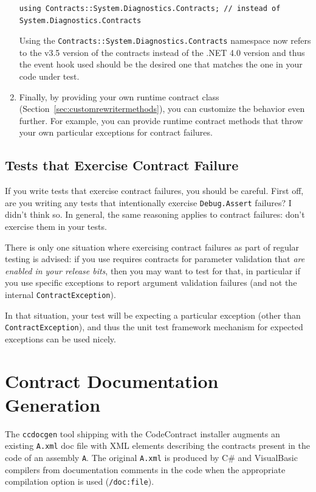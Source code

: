 \documentclass{article}
\newcommand{\code}[1]{\lstinline{#1}}
\begin{document}
\begin{enumerate}
\begin{lstlisting}
using Contracts::System.Diagnostics.Contracts; // instead of System.Diagnostics.Contracts
\end{lstlisting}
\noindent
Using the \code{Contracts::System.Diagnostics.Contracts} namespace now
refers to the v3.5 version of the contracts instead of the .NET 4.0
version and thus the event hook used should be the desired one that
matches the one in your code under test.

\item Finally, by providing your own runtime contract class
  (Section~\ref{sec:customrewritermethods}), you can customize the
  behavior even further. For example, you can provide runtime
  contract methods that throw your own particular exceptions for
  contract failures.
\end{enumerate}

\subsection{Tests that Exercise Contract Failure}
If you write tests that exercise contract failures, you should be
careful. First off, are you writing any tests that intentionally exercise
\code{Debug.Assert} failures? I didn't think so. In general, the same
reasoning applies to contract failures: don't exercise them in your
tests.

There is only one situation where exercising contract failures as part
of regular testing is advised: if you use requires contracts for
parameter validation that \emph{are enabled in your release bits}, then you may
want to test for that, in particular if you use specific exceptions to
report argument validation failures (and not the internal \code{ContractException}).

In that situation, your test will be expecting a particular exception
(other than \code{ContractException}), and thus the unit test
framework mechanism for expected exceptions can be used nicely.
 
\section{Contract Documentation Generation}
\label{sec:docgen}
The \code{ccdocgen} tool shipping with the CodeContract installer
augments an existing \code{A.xml} doc file with XML elements describing
the contracts present in the code of an assembly \code{A}. The
original \code{A.xml} is produced by C\# and VisualBasic compilers
from documentation comments in the code when the appropriate
compilation option is used (\code{/doc:file}).
\end{document}
